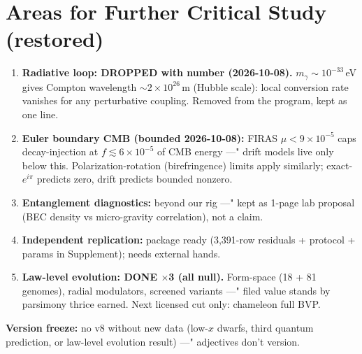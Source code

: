 \documentclass[twocolumn]{aastex631}
\begin{document}
\section{Areas for Further Critical Study (restored)}
\begin{enumerate}
\item \textbf{Radiative loop: DROPPED with number (2026-10-08).} $m_\gamma\sim10^{-33}$\,eV gives Compton wavelength $\sim2\times10^{26}$\,m (Hubble scale): local conversion rate vanishes for any perturbative coupling. Removed from the program, kept as one line.
\item \textbf{Euler boundary CMB (bounded 2026-10-08):} FIRAS $\mu<9\times10^{-5}$ caps decay-injection at $f\lesssim6\times10^{-5}$ of CMB energy ---" drift models live only below this. Polarization-rotation (birefringence) limits apply similarly; exact-$e^{i\pi}$ predicts zero, drift predicts bounded nonzero.
\item \textbf{Entanglement diagnostics:} beyond our rig ---" kept as 1-page lab proposal (BEC density vs micro-gravity correlation), not a claim.
\item \textbf{Independent replication:} package ready (3,391-row residuals + protocol + params in Supplement); needs external hands.
\item \textbf{Law-level evolution: DONE $\times$3 (all null).} Form-space (18 + 81 genomes), radial modulators, screened variants ---" filed value stands by parsimony thrice earned. Next licensed cut only: chameleon full BVP.
\end{enumerate}
\textbf{Version freeze:} no v8 without new data (low-$x$ dwarfs, third quantum prediction, or law-level evolution result) ---" adjectives don't version.
\end{document}
